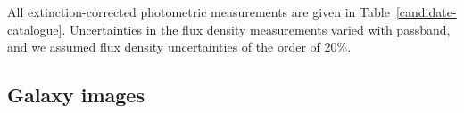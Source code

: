 \documentclass[times,usenatbib]{mn2e}
\begin{document}
All extinction-corrected photometric measurements are given in Table~\ref{candidate-catalogue}. Uncertainties in the flux density measurements varied with passband, and we assumed flux density uncertainties of the order of 20\%.

\subsection{Galaxy images}

\begin{figure}
\begin{center}

\end{center}
\end{figure}
\end{document}
